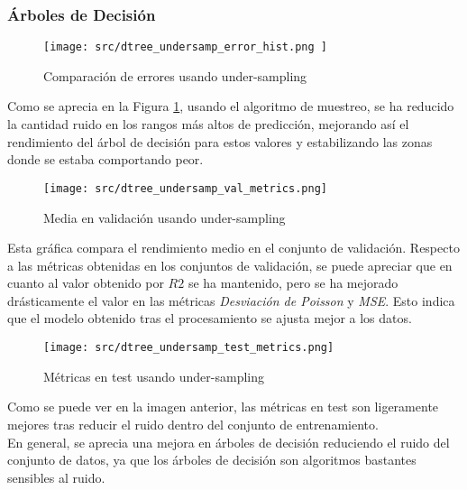 \subsubsection*{Árboles de Decisión}
\begin{figure}[H]
	\centering
	\texttt{[image: src/dtree\_undersamp\_error\_hist.png ]}
	\caption{Comparación de errores usando under-sampling}
	\label{fig:cmp_error_dtree}
\end{figure}
Como se aprecia en la Figura \ref{fig:cmp_error_dtree}, usando el algoritmo de muestreo, se ha reducido la cantidad ruido en los rangos más altos de predicción, mejorando así el rendimiento del árbol de decisión para estos valores y estabilizando las zonas donde se estaba comportando peor.
\begin{figure}[H]
	\centering
	\texttt{[image: src/dtree\_undersamp\_val\_metrics.png]}
	\caption{Media en validación usando under-sampling}
	\label{fig:cmp_val_dtree}
\end{figure}
Esta gráfica compara el rendimiento medio en el conjunto de validación.
Respecto a las métricas obtenidas en los conjuntos de validación, se puede apreciar que en cuanto al valor obtenido por $R2$ se ha mantenido, pero se ha mejorado drásticamente el valor en las métricas \textit{Desviación de Poisson} y \textit{MSE}. Esto indica que el modelo obtenido tras el procesamiento se ajusta mejor a los datos.
\begin{figure}[H]
	\centering
	\texttt{[image: src/dtree\_undersamp\_test\_metrics.png]}
	\caption{Métricas en test usando under-sampling}
	\label{fig:cmp_test_dtree}
\end{figure}
Como se puede ver en la imagen anterior, las métricas en test son ligeramente mejores tras reducir el ruido dentro del conjunto de entrenamiento.\\
\linebreak
En general, se aprecia una mejora en árboles de decisión reduciendo el ruido del conjunto de datos, ya que los árboles de decisión son algoritmos bastantes sensibles al ruido.
